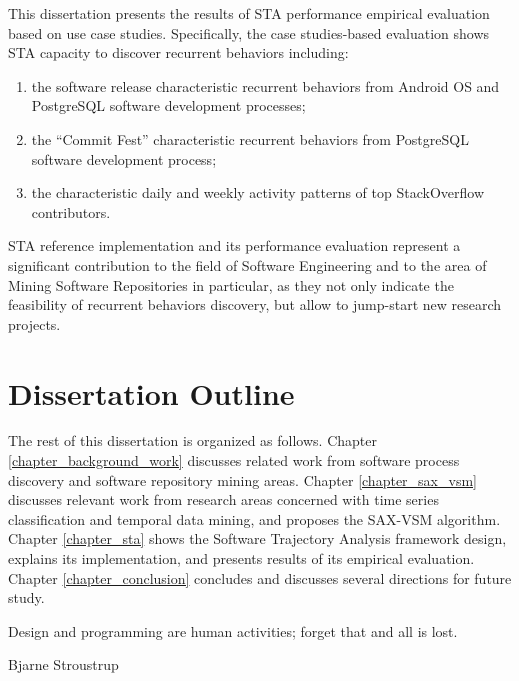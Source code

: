 \begin{enumerate}
This dissertation presents the results of STA performance empirical evaluation based on use case studies. 
Specifically, the case studies-based evaluation shows STA capacity to discover recurrent behaviors including: 
\begin{enumerate}
 \item the software release characteristic recurrent behaviors from Android OS and PostgreSQL software development processes;
 \item the ``Commit Fest'' characteristic recurrent behaviors from PostgreSQL software development process; 
 \item the characteristic daily and weekly activity patterns of top StackOverflow contributors.
\end{enumerate}

STA reference implementation and its performance evaluation represent a significant contribution to the
field of Software Engineering and to the area of Mining Software Repositories in particular, 
as they not only indicate the feasibility of recurrent behaviors discovery, but allow to jump-start new research projects.

\end{enumerate}

\section{Dissertation Outline}\label{section_organization}
The rest of this dissertation is organized as follows. 
Chapter \ref{chapter_background_work} discusses related work from software process discovery and software repository mining areas.
Chapter \ref{chapter_sax_vsm} discusses relevant work from research areas concerned with time series classification and temporal data mining, and proposes the  SAX-VSM algorithm.
Chapter \ref{chapter_sta} shows the Software Trajectory Analysis framework design, explains its implementation, and presents results of its empirical evaluation. 
Chapter \ref{chapter_conclusion} concludes and discusses several directions for future study.

\epigraph{Design and programming are human activities; forget that and all is lost.}{Bjarne Stroustrup}